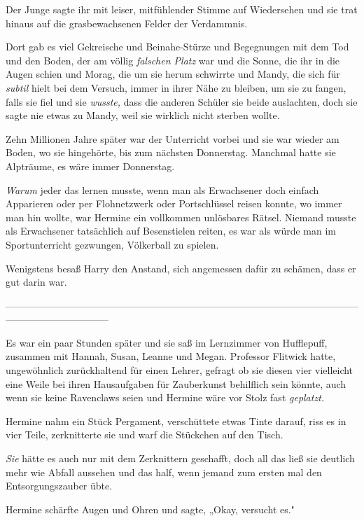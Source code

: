 {Der Junge sagte ihr mit leiser, mitfühlender Stimme auf Wiedersehen und sie trat hinaus auf die grasbewachsenen Felder der Verdammnis.

Dort gab es viel Gekreische und Beinahe-Stürze und Begegnungen mit dem Tod und den Boden, der am völlig \emph{falschen Platz} war und die Sonne, die ihr in die Augen schien und Morag, die um sie herum schwirrte und Mandy, die sich für \emph{subtil} hielt bei dem Versuch, immer in ihrer Nähe zu bleiben, um sie zu fangen, falls sie fiel und sie \emph{wusste,} dass die anderen Schüler sie beide auslachten, doch sie sagte nie etwas zu Mandy, weil sie wirklich nicht sterben wollte.

Zehn Millionen Jahre später war der Unterricht vorbei und sie war wieder am Boden, wo sie hingehörte, bis zum nächsten Donnerstag. Manchmal hatte sie Alpträume, es wäre immer Donnerstag.

\emph{Warum} jeder das lernen musste, wenn man als Erwachsener doch einfach Apparieren oder per Flohnetzwerk oder Portschlüssel reisen konnte, wo immer man hin wollte, war Hermine ein vollkommen unlösbares Rätsel. Niemand musste als Erwachsener tatsächlich auf Besenstielen reiten, es war als würde man im Sportunterricht gezwungen, Völkerball zu spielen.

Wenigstens besaß Harry den Anstand, sich angemessen dafür zu schämen, dass er gut darin war.

--------------------------------------------------------------------------------------------------------------------------------------------

\hfill\break Es war ein paar Stunden später und sie saß im Lernzimmer von Hufflepuff, zusammen mit Hannah, Susan, Leanne und Megan. Professor Flitwick hatte, ungewöhnlich zurückhaltend für einen Lehrer, gefragt ob sie diesen vier vielleicht eine Weile bei ihren Hausaufgaben für Zauberkunst behilflich sein könnte, auch wenn sie keine Ravenclaws seien und Hermine wäre vor Stolz fast \emph{geplatzt.}

Hermine nahm ein Stück Pergament, verschüttete etwas Tinte darauf, riss es in vier Teile, zerknitterte sie und warf die Stückchen auf den Tisch.

\emph{Sie} hätte es auch nur mit dem Zerknittern geschafft, doch all das ließ sie deutlich mehr wie Abfall aussehen und das half, wenn jemand zum ersten mal den Entsorgungszauber übte.

Hermine schärfte Augen und Ohren und sagte, „Okay, versucht es."

}
